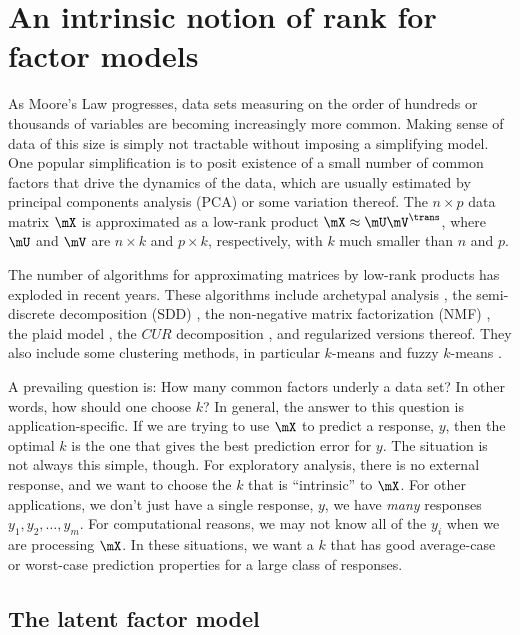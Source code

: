 
\chapter{An intrinsic notion of rank for factor models}

As Moore's Law progresses, data sets measuring on the order of hundreds or
thousands of variables are becoming increasingly more common. Making sense of
data of this size is simply not tractable without imposing a simplifying
model. One popular simplification is to posit existence of a small number of
common factors that drive the dynamics of the data, which are usually
estimated by principal components analysis (PCA) or some variation thereof.
The $n \times p$ data matrix $\mX$ is approximated as a low-rank product $\mX
\approx \mU \mV^\trans$, where $\mU$ and $\mV$ are $n \times k$ and $p \times
k$, respectively, with $k$ much smaller than $n$ and $p$.

The number of algorithms for approximating matrices by low-rank products has
exploded in recent years. These algorithms include archetypal analysis
\cite{cutler1994aa}, the semi-discrete decomposition (SDD)
\cite{kolda1998smd}, the non-negative matrix factorization (NMF)
\cite{lee1999lpo}, the plaid model \cite{lazzeroni2002pmg}, the $CUR$
decomposition \cite{drineas2007fmc}, and regularized versions thereof. They
also include some clustering methods, in particular $k$-means and fuzzy
$k$-means \cite{bezdek1980fmp}.

A prevailing question is: How many common factors underly a data set? In other
words, how should one choose $k$? In general, the answer to this question is
application-specific. If we are trying to use $\mX$ to predict a response,
$y$, then the optimal $k$ is the one that gives the best prediction error
for $y$. The situation is not always this simple, though. For exploratory
analysis, there is no external response, and we want to choose the $k$ that is
``intrinsic'' to $\mX$. For other applications, we don't just have a single
response, $y$, we have \emph{many} responses $y_1, y_2, \ldots, y_m$.
For computational reasons, we may not know all of the $y_i$ when we are
processing $\mX$. In these situations, we want a $k$ that has good
average-case or worst-case prediction properties for a large class of 
responses.


\section{The latent factor model}\label{S:latent-factor-model}


